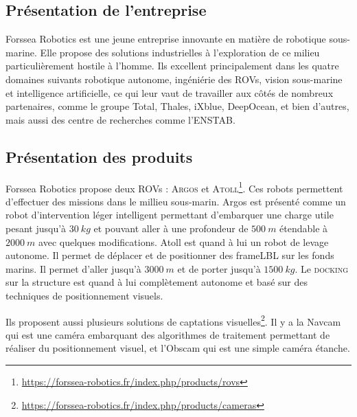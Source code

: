 \subsection{Présentation de l'entreprise}
    Forssea Robotics est une jeune entreprise innovante en matière de robotique sous-marine. Elle propose des solutions industrielles à l'exploration de ce milieu particulièrement hostile à l'homme. Ils excellent principalement dans les quatre domaines suivants robotique autonome, ingéniérie des \gls{ROV}s, vision sous-marine et intelligence artificielle, ce qui leur vaut de travailler aux côtés de nombreux partenaires, comme le groupe Total, Thales, iXblue, DeepOcean, et bien d'autres, mais aussi des centre de recherches comme l'\gls{ENSTAB}.

\subsection{Présentation des produits}
    Forssea Robotics propose deux \gls{ROV}s : \textsc{Argos} et \textsc{Atoll}\footnote{\url{https://forssea-robotics.fr/index.php/products/rovs}}. Ces robots permettent d'effectuer des missions dans le millieu sous-marin. \gls{Argos} est présenté comme un robot d'intervention léger intelligent permettant d'embarquer une charge utile pesant jusqu'à $30\ kg$ et pouvant aller à une profondeur de $500\ m$ étendable à $2000\ m$ avec quelques modifications. \gls{Atoll} est quand à lui un robot de levage autonome. Il permet de déplacer et de positionner des \gls{frameLBL} sur les fonds marins. Il permet d'aller jusqu'à $3000\ m$ et de porter jusqu'à $1500\ kg$. Le \textsc{docking} sur la structure est quand à lui complètement autonome et basé sur des techniques de positionnement visuels.

    Ils proposent aussi plusieurs solutions de captations visuelles\footnote{\url{https://forssea-robotics.fr/index.php/products/cameras}}. Il y a la \gls{Navcam} qui est une caméra embarquant des algorithmes de traitement permettant de réaliser du positionnement visuel, et l'\gls{Obscam} qui est une simple caméra étanche.